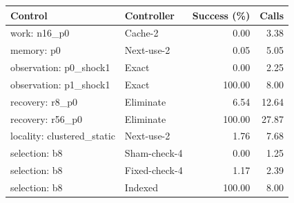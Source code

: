 \begin{tabular}{llrr}
\toprule
Control & Controller & Success (\%) & Calls\\
\midrule
work: n16\_p0 & Cache-2 & 0.00 & 3.38\\
memory: p0 & Next-use-2 & 0.05 & 5.05\\
observation: p0\_shock1 & Exact & 0.00 & 2.25\\
observation: p1\_shock1 & Exact & 100.00 & 8.00\\
recovery: r8\_p0 & Eliminate & 6.54 & 12.64\\
recovery: r56\_p0 & Eliminate & 100.00 & 27.87\\
locality: clustered\_static & Next-use-2 & 1.76 & 7.68\\
selection: b8 & Sham-check-4 & 0.00 & 1.25\\
selection: b8 & Fixed-check-4 & 1.17 & 2.39\\
selection: b8 & Indexed & 100.00 & 8.00\\
\bottomrule
\end{tabular}